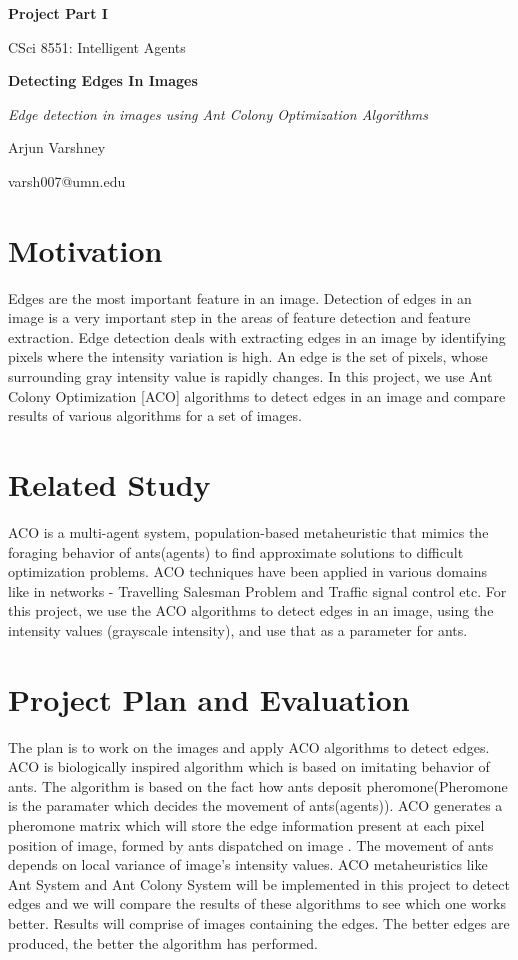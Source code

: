 \documentclass[11pt]{article}
\begin{document}
\thispagestyle{empty}

\centerline{\textbf{\Large{Project Part I}}}
\centerline{CSci 8551: Intelligent Agents}
\bigskip
\bigskip
\centerline{\textbf{\Large{Detecting Edges In Images}}}
\centerline{\it{\Large{Edge detection in images using Ant Colony Optimization Algorithms}}}
\bigskip
\centerline{\Large{Arjun Varshney}}
\centerline{varsh007@umn.edu}

\section*{Motivation} 
Edges are the most important feature in an image. Detection of edges in an image is a very important step in the areas of feature detection and feature extraction. Edge detection deals with extracting edges in an image by identifying pixels where the intensity variation is high. An edge is the set of pixels, whose surrounding gray intensity value is rapidly changes. In this project, we use Ant Colony Optimization [ACO] algorithms to detect edges in an image and compare results of various algorithms for a set of images.  

\section*{Related Study}
ACO is a multi-agent system, population-based metaheuristic that mimics the foraging behavior of ants(agents) to find approximate solutions to difficult optimization problems. ACO techniques have been applied in various domains like in networks - Travelling Salesman Problem and Traffic signal control etc. For this project, we use the ACO algorithms to detect edges in an image, using the intensity values (grayscale intensity), and use that as a parameter for ants.

\section*{Project Plan and Evaluation}
The plan is to work on the images and apply ACO algorithms to detect edges. ACO is biologically inspired algorithm which is based on imitating behavior of ants. The algorithm is based on the fact how ants deposit pheromone(Pheromone is the paramater which decides the movement of ants(agents)). ACO generates a pheromone matrix which will store the edge information present at each pixel position of image, formed by ants dispatched on image \cite{MDKS}. The movement of ants depends on local variance of image's intensity values. ACO metaheuristics \cite{JTWYSX} like Ant System and Ant Colony System will be  implemented in this project to detect edges and we will compare the results of these algorithms to see which one works better. Results will comprise of images containing the edges. The better edges are produced, the better the algorithm has performed.  
	
\end{document}
